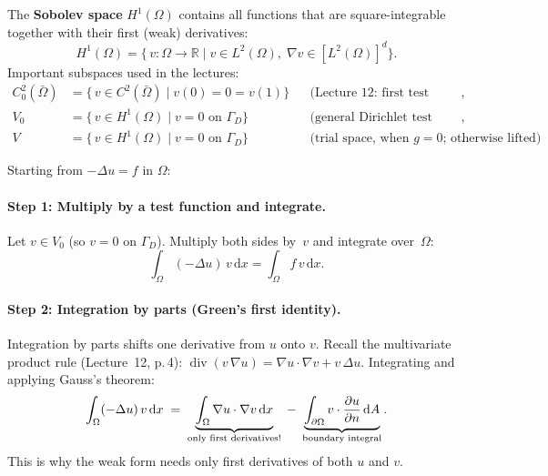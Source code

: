\documentclass[11pt,a4paper]{article}
\theoremstyle{plain}
\theoremstyle{remark}
\newcommand{\R}{\mathbb{R}}
\newcommand{\pd}[2]{\frac{\partial #1}{\partial #2}}
\newcommand{\dx}{\,\mathrm{d}x}
\newcommand{\dA}{\,\mathrm{d}A}
\let\origparagraph\paragraph
\renewcommand{\paragraph}[1]{\needspace{4\baselineskip}\origparagraph{#1}}
\begin{document}
\begin{definition}
The \textbf{Sobolev space} $H^1(\Omega)$ contains all functions that are
square-integrable together with their first (weak) derivatives:
\[
  H^1(\Omega)
  = \bigl\{\, v : \Omega \to \R
    \;\big|\;
    v \in L^2(\Omega),\;
    \nabla v \in [L^2(\Omega)]^d
    \bigr\}.
\]
Important subspaces used in the lectures:
\begin{align*}
  C_0^2(\bar{\Omega})
    &= \bigl\{\, v \in C^2(\bar{\Omega})
       \;\big|\; v(0) = 0 = v(1) \bigr\}
    && \text{(Lecture~12: first test space)},\\[2pt]
  V_0
    &= \bigl\{\, v \in H^1(\Omega)
       \;\big|\; v = 0 \text{ on } \Gamma_D \bigr\}
    && \text{(general Dirichlet test space)},\\[2pt]
  V
    &= \bigl\{\, v \in H^1(\Omega)
       \;\big|\; v = 0 \text{ on } \Gamma_D \bigr\}
    && \text{(trial space, when $g=0$; otherwise lifted)}.
\end{align*}
\end{definition}

\medskip\noindent
Starting from $-\Delta u = f$ in $\Omega$:

\paragraph{Step 1: Multiply by a test function and integrate.}
Let $v \in V_0$ (so $v = 0$ on $\Gamma_D$).
Multiply both sides by~$v$ and integrate over~$\Omega$:
\[
  \int_\Omega (-\Delta u)\, v \dx
  = \int_\Omega f\, v \dx.
\]

\paragraph{Step 2: Integration by parts (Green's first identity).}

\begin{keyidea}
Integration by parts shifts one derivative from $u$ onto $v$.
Recall the multivariate product rule (Lecture~12, p.\,4):
$\operatorname{div}(v\,\nabla u) = \nabla u \cdot \nabla v + v\,\Delta u$.
Integrating and applying Gauss's theorem:
\[
  \int_\Omega (-\Delta u)\, v \dx
  \;=\;
  \underbrace{\int_\Omega \nabla u \cdot \nabla v \dx}_{%
    \text{only first derivatives!}}
  \;-\;
  \underbrace{\int_{\partial\Omega}
    v \cdot \pd{u}{n} \dA}_{\text{boundary integral}}.
\]
This is why the weak form needs only first derivatives of both $u$
and $v$.
\end{keyidea}
\end{document}

